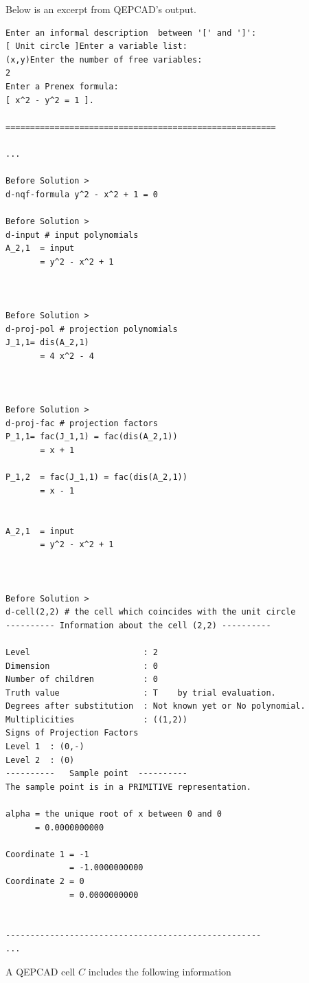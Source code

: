 \documentclass[
]{book}
\theoremstyle{definition}
\theoremstyle{definition}
\theoremstyle{definition}
\theoremstyle{definition}
\theoremstyle{remark}
\begin{document}
Below is an excerpt from QEPCAD's output.

\begin{verbatim}
Enter an informal description  between '[' and ']':
[ Unit circle ]Enter a variable list:
(x,y)Enter the number of free variables:
2
Enter a Prenex formula:
[ x^2 - y^2 = 1 ].

=======================================================

...

Before Solution >
d-nqf-formula y^2 - x^2 + 1 = 0

Before Solution >
d-input # input polynomials
A_2,1  = input
       = y^2 - x^2 + 1



Before Solution >
d-proj-pol # projection polynomials
J_1,1= dis(A_2,1)
       = 4 x^2 - 4



Before Solution >
d-proj-fac # projection factors
P_1,1= fac(J_1,1) = fac(dis(A_2,1))
       = x + 1

P_1,2  = fac(J_1,1) = fac(dis(A_2,1))
       = x - 1


A_2,1  = input
       = y^2 - x^2 + 1



Before Solution >
d-cell(2,2) # the cell which coincides with the unit circle
---------- Information about the cell (2,2) ----------

Level                       : 2
Dimension                   : 0
Number of children          : 0
Truth value                 : T    by trial evaluation.
Degrees after substitution  : Not known yet or No polynomial.
Multiplicities              : ((1,2))
Signs of Projection Factors
Level 1  : (0,-)
Level 2  : (0)
----------   Sample point  ----------
The sample point is in a PRIMITIVE representation.

alpha = the unique root of x between 0 and 0
      = 0.0000000000

Coordinate 1 = -1
             = -1.0000000000
Coordinate 2 = 0
             = 0.0000000000


----------------------------------------------------
...
\end{verbatim}

A QEPCAD cell \(C\) includes the following information
\end{document}

